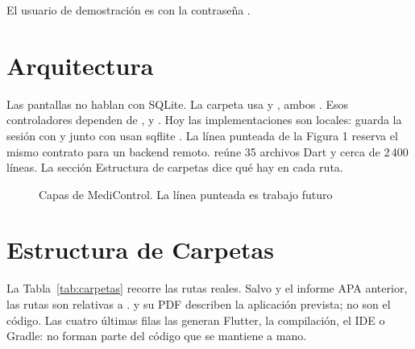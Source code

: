 \documentclass[stu,letterpaper,floatsintext,nolmodern,nofontenc]{apa7}
\begin{document}
El usuario de demostración es  con la contraseña .

\section{Arquitectura}

Las pantallas no hablan con SQLite.
La carpeta  usa  y , ambos  \parencite{changeNotifier,providerPkg}.
Esos controladores dependen de ,  y .
Hoy las implementaciones son locales:  guarda la sesión con  y  junto con  usan sqflite \parencite{sharedPrefs,sqflitePkg}.
La línea punteada de la Figura 1 reserva el mismo contrato para un backend remoto.
 reúne 35 archivos Dart y cerca de 2\,400 líneas.
La sección Estructura de carpetas dice qué hay en cada ruta.

\begin{figure}[H]
\caption{Capas de MediControl. La línea punteada es trabajo futuro}
\centering
{\linespread{1}\selectfont
{}}
\end{figure}

\section{Estructura de Carpetas}

La Tabla~\ref{tab:carpetas} recorre las rutas reales.
Salvo  y el informe APA anterior, las rutas son relativas a .
 y su PDF describen la aplicación prevista; no son el código.
Las cuatro últimas filas las generan Flutter, la compilación, el IDE o Gradle: no forman parte del código que se mantiene a mano.
\end{document}
